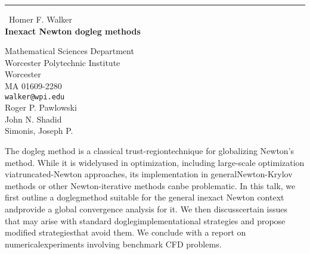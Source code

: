 \documentclass{report}
\begin{document}
\begin{center}
\rule{6in}{1pt} \
{\large Homer F. Walker \\
{\bf Inexact Newton dogleg methods}}

Mathematical Sciences Department \\ Worcester Polytechnic Institute \\ Worcester \\ MA 01609-2280
\\
{\tt walker@wpi.edu}\\
Roger P.  Pawlowski\\
John N.  Shadid\\
	Simonis, Joseph P. \end{center}

The dogleg method is a classical trust-regiontechnique for globalizing Newton's method.
While it is widelyused in optimization,
including large-scale optimization viatruncated-Newton approaches,
its implementation in generalNewton-Krylov methods or other Newton-iterative methods canbe problematic.
In this talk,
we first outline a doglegmethod suitable for the general inexact Newton context andprovide a global convergence analysis for it.
We then discusscertain issues that may arise with standard doglegimplementational strategies and propose modified strategiesthat avoid them.
We conclude with a report on numericalexperiments involving benchmark CFD problems.
\end{document}
